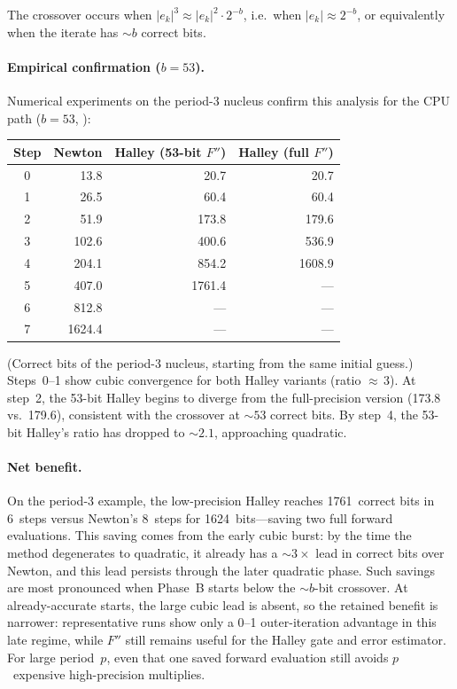 The crossover occurs when $|e_k|^3 \approx |e_k|^2 \cdot 2^{-b}$,
i.e.\ when $|e_k| \approx 2^{-b}$, or equivalently when the iterate has
${\sim}b$ correct bits.

\paragraph{Empirical confirmation ($b = 53$).}
Numerical experiments on the period-3 nucleus confirm this analysis
for the CPU path ($b = 53$, ):

\begin{center}
\begin{tabular}{crrr}
\hline
\textbf{Step} & \textbf{Newton} & \textbf{Halley (53-bit $F''$)}
              & \textbf{Halley (full $F''$)} \\
\hline
0 &  13.8 &  20.7 &  20.7 \\
1 &  26.5 &  60.4 &  60.4 \\
2 &  51.9 & 173.8 & 179.6 \\
3 & 102.6 & 400.6 & 536.9 \\
4 & 204.1 & 854.2 & 1608.9 \\
5 & 407.0 & 1761.4 & --- \\
6 & 812.8 & --- & --- \\
7 & 1624.4 & --- & --- \\
\hline
\end{tabular}
\end{center}

(Correct bits of the period-3 nucleus, starting from the same initial guess.)
Steps~0--1 show cubic convergence for both Halley variants (ratio
${\approx}\,3$). At step~2, the 53-bit Halley begins to diverge from the
full-precision version (173.8 vs.\ 179.6), consistent with the crossover at
${\sim}53$ correct bits.  By step~4, the 53-bit Halley's ratio has dropped to
${\sim}2.1$, approaching quadratic.

\paragraph{Net benefit.}
On the period-3 example, the low-precision Halley reaches 1761~correct bits
in 6~steps versus Newton's 8~steps for 1624~bits---saving two full forward
evaluations.  This saving comes from the early cubic burst: by the time the
method degenerates to quadratic, it already has a ${\sim}3\times$ lead in
correct bits over Newton, and this lead persists through the later quadratic
phase.  Such savings are most pronounced when Phase~B starts below the
${\sim}b$-bit crossover.  At already-accurate starts, the large cubic lead is
absent, so the retained benefit is narrower: representative runs show only a
0--1 outer-iteration advantage in this late regime, while $F''$ still remains
useful for the Halley gate and error estimator.  For large period~$p$, even
that one saved forward evaluation still avoids $p$~expensive
high-precision multiplies.


